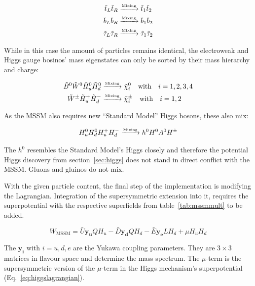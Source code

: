 \begin{align}
  \label{eq:3fammix}
  \tilde{t}_L \tilde{t}_R & \xrightarrow{\text{\tiny{Mixing}}} \tilde{t}_1 \tilde{t}_2 \\
  \tilde{b}_L \tilde{b}_R & \xrightarrow{\text{\tiny{Mixing}}} \tilde{b}_1 \tilde{b}_2 \\
  \tilde{\tau}_L \tilde{\tau}_R & \xrightarrow{\text{\tiny{Mixing}}} \tilde{\tau}_1 \tilde{\tau}_2
\end{align}

\noindent While in this case the amount of particles remains identical, the electroweak and Higgs gauge bosinos' mass eigenstates can only be sorted by their mass hierarchy and charge:

\begin{align}
  \label{eq:ewhsusymix}
  \tilde{B}^0 \tilde{W}^0 \tilde{H}^0_u \tilde{H}^0_d & \xrightarrow{\text{\tiny{Mixing}}} \tilde{\chi}^0_i \quad \text{with} \quad i = 1,2,3,4 \\
  \tilde{W}^\pm \tilde{H}^+_u \tilde{H}^-_d & \xrightarrow{\text{\tiny{Mixing}}} \tilde{\chi}^\pm_i \quad \text{with} \quad i = 1,2
\end{align}

\noindent As the MSSM also requires new ``Standard Model'' Higgs bosons, these also mix:

\begin{equation}
  \label{eq:hmix}
  H^0_u H^0_d H^+_u H^-_d \xrightarrow{\text{\tiny{Mixing}}} h^0 H^0 A^0 H^\pm
\end{equation}

\noindent The $h^0$ resembles the Standard Model's Higgs closely and therefore the potential Higgs discovery from section~\ref{sec:higgs} does not stand in direct conflict with the MSSM. Gluons and gluinos do not mix.

With the given particle content, the final step of the implementation is modifying the Lagrangian. Integration of the supersymmetric extension into it, requires the superpotential with the respective superfields from table~\ref{tab:mssmmult} to be added.

\begin{equation}
  \label{eq:mssmsuperpot}
  W_{\text{MSSM}} = \bar{U} \mathbf{y_u} Q H_u - \bar{D} \mathbf{y_d} Q H_d - \bar{E} \mathbf{y_e} L H_d + \mu H_u H_d
\end{equation}

\noindent The $\mathbf{y_i}$ with $i = u,d,e$ are the Yukawa coupling parameters. They are $3 \times 3$ matrices in flavour space and determine the mass spectrum. The $\mu$-term is the supersymmetric version of the $\mu$-term in the Higgs mechanism's superpotential (Eq.~\ref{eq:higgslagrangian}).

